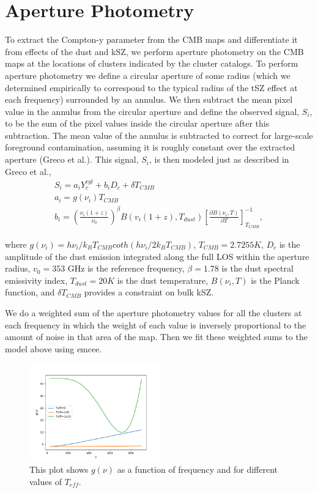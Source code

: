 \documentclass{princeton_astro_thesis}
\begin{document}
\section{Aperture Photometry}
To extract the Compton-y parameter from the CMB maps and differentiate it from effects of the dust and kSZ, we perform aperture photometry on the CMB maps at the locations of clusters indicated by the cluster catalogs. To perform aperture photometry we define a circular aperture of some radius (which we determined empirically to correspond to the typical radius of the tSZ effect at each frequency) surrounded by an annulus. We then subtract the mean pixel value in the annulus from the circular aperture and define the observed signal, $S_i$, to be the sum of the pixel values inside the circular aperture after this subtraction. The mean value of the annulus is subtracted to correct for large-scale foreground contamination, assuming it is roughly constant over the extracted aperture (Greco et al.). This signal, $S_i$, is then modeled just as described in Greco et al.,
\begin{equation}
\begin{aligned}
S_i=a_i Y^{cyl}_{c}+b_i D_c +\delta T_{CMB} \\
a_i=g(\nu_i) T_{CMB}\\
b_i=\left(\frac{\nu_i(1+z)}{\nu_0}\right)^\beta B (v_i(1+z),T_{dust})\left[\frac{\partial B(\nu_i,T)}{\partial T} \right]^{-1}_{T_{CMB}},
\end{aligned}
\end{equation}


where $g(\nu_i)=h\nu_i/k_B T_{CMB} coth(h\nu_i/2k_B T_{CMB})$, $T_{CMB}=2.7255 K$, $D_c$ is the amplitude of the dust emission integrated along the full LOS within the aperture radius, $v_0=353$ GHz is the reference frequency, $\beta=1.78$ is the dust spectral emissivity index, $T_{dust}= 20 K$ is the dust temperature, $B(\nu_i,T)$ is the Planck function, and $\delta T_{CMB}$ provides a constraint on bulk kSZ.\par
We do a weighted sum of the aperture photometry values for all the clusters at each frequency in which the weight of each value is inversely proportional to the amount of noise in that area of the map. Then we fit these weighted sums to the model above using emcee.
\begin{figure}[h]
\centering
\includegraphics[width=0.5\textwidth]{../gnu.png}
\caption{This plot shows $g(\nu)$ as a function of frequency and for different values of $T_{eff}$. }
\end{figure}
\end{document}
